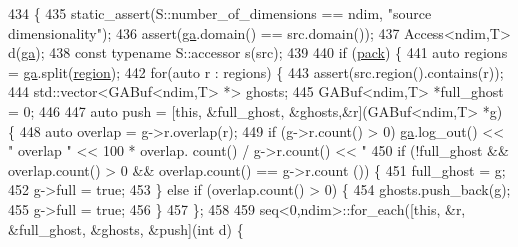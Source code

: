 \begin{DoxyCode}
434                                                               \{
435             static\_assert(S::number\_of\_dimensions == ndim, \textcolor{stringliteral}{"source dimensionality"});
436             assert(\hyperlink{classshark_1_1ndim_1_1_g_a_dest_aa64cb1bd1f2155c6cca997e4ba69760e}{ga}.domain() == src.domain());
437             Access<ndim,T> d(\hyperlink{classshark_1_1ndim_1_1_g_a_dest_aa64cb1bd1f2155c6cca997e4ba69760e}{ga});
438             \textcolor{keyword}{const} \textcolor{keyword}{typename} S::accessor s(src);
439 
440                         \textcolor{keywordflow}{if} (\hyperlink{classshark_1_1ndim_1_1_g_a_dest_aeef6b8ca8d9d57db09b32949e0493aca}{pack}) \{
441                             \textcolor{keyword}{auto} regions = \hyperlink{classshark_1_1ndim_1_1_g_a_dest_aa64cb1bd1f2155c6cca997e4ba69760e}{ga}.split(\hyperlink{classshark_1_1ndim_1_1_g_a_dest_a13e2c3f9bc86ceec20bd4c98bf4699b2}{region});
442                             \textcolor{keywordflow}{for}(\textcolor{keyword}{auto} r : regions) \{
443                                 assert(src.region().contains(r));
444                                 std::vector<GABuf<ndim,T> *> ghosts;
445                                 GABuf<ndim,T> *full\_ghost = 0;
446 
447                                 \textcolor{keyword}{auto} push = [\textcolor{keyword}{this}, &full\_ghost, &ghosts,&r](GABuf<ndim,T> *g) \{
448                                     \textcolor{keyword}{auto} overlap = g->r.overlap(r); 
449                                     \textcolor{keywordflow}{if} (g->r.count() > 0) \hyperlink{classshark_1_1ndim_1_1_g_a_dest_aa64cb1bd1f2155c6cca997e4ba69760e}{ga}.log\_out() << \textcolor{stringliteral}{" overlap "} << 100 * overlap.
      count() / g->r.count() << \textcolor{stringliteral}{"%
450                                     \textcolor{keywordflow}{if} (!full\_ghost && overlap.count() > 0 && overlap.count() == g->r.count
      ()) \{
451                                         full\_ghost = g;
452                                         g->full = \textcolor{keyword}{true};
453                                     \} \textcolor{keywordflow}{else} \textcolor{keywordflow}{if} (overlap.count() > 0) \{
454                                         ghosts.push\_back(g);
455                                         g->full = \textcolor{keyword}{true};
456                                     \}
457                                 \};
458 
459                                 seq<0,ndim>::for\_each([\textcolor{keyword}{this}, &r, &full\_ghost, &ghosts, &push](\textcolor{keywordtype}{int} d) \{
}
\end{DoxyCode}
